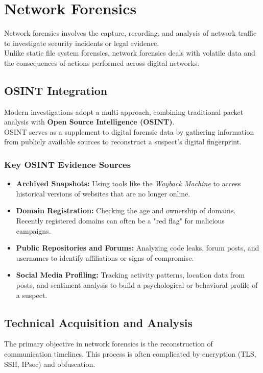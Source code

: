 \section{Network Forensics}

Network forensics involves the capture, recording, and analysis of network traffic to investigate security incidents or legal evidence.\\
Unlike static file system forensics, network forensics deals with volatile data and the consequences of actions performed across digital networks.

\subsection{OSINT Integration}
Modern investigations adopt a multi approach, combining traditional packet analysis with \textbf{Open Source Intelligence (OSINT)}.\\
OSINT serves as a supplement to digital forensic data by gathering information from publicly available sources to reconstruct a suspect's digital fingerprint.

\subsubsection*{Key OSINT Evidence Sources}
\begin{itemize}
    \item \textbf{Archived Snapshots:} Using tools like the \textit{Wayback Machine} to access historical versions of websites that are no longer online.
    \item \textbf{Domain Registration:} Checking the age and ownership of domains. Recently registered domains can often be a "red flag" for malicious campaigns.
    \item \textbf{Public Repositories and Forums:} Analyzing code leaks, forum posts, and usernames to identify affiliations or signs of compromise.
    \item \textbf{Social Media Profiling:} Tracking activity patterns, location data from posts, and sentiment analysis to build a psychological or behavioral profile of a suspect.
\end{itemize}

\subsection{Technical Acquisition and Analysis}
The primary objective in network forensics is the reconstruction of communication timelines. This process is often complicated by encryption (TLS, SSH, IPsec) and obfuscation.

